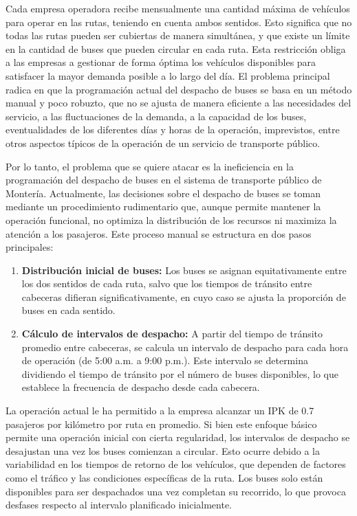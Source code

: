 \documentclass[preprint,11pt]{elsarticle}
\begin{document}
Cada empresa operadora recibe mensualmente una cantidad máxima de vehículos para operar en las rutas, teniendo en cuenta ambos sentidos. Esto significa que no todas las rutas pueden ser cubiertas de manera simultánea, y que existe un límite en la cantidad de buses que pueden circular en cada ruta. Esta restricción obliga a las empresas a gestionar de forma óptima los vehículos disponibles para satisfacer la mayor demanda posible a lo largo del día. El problema principal radica en que la programación actual del despacho de buses se basa en un método manual y poco robuzto, que no se ajusta de manera eficiente a las necesidades del servicio, a las fluctuaciones de la demanda, a la capacidad de los buses, eventualidades de los diferentes días y horas de la operación, imprevistos, entre otros aspectos típicos de la operación de un servicio de transporte público.

Por lo tanto, el problema que se quiere atacar es la ineficiencia en la programación del despacho de buses en el sistema de transporte público de Montería. Actualmente, las decisiones sobre el despacho de buses se toman mediante un procedimiento rudimentario que, aunque permite mantener la operación funcional, no optimiza la distribución de los recursos ni maximiza la atención a los pasajeros. Este proceso manual se estructura en dos pasos principales:

\begin{enumerate}
    \item \textbf{Distribución inicial de buses:} Los buses se asignan equitativamente entre los dos sentidos de cada ruta, salvo que los tiempos de tránsito entre cabeceras difieran significativamente, en cuyo caso se ajusta la proporción de buses en cada sentido.
    \item \textbf{Cálculo de intervalos de despacho:} A partir del tiempo de tránsito promedio entre cabeceras, se calcula un intervalo de despacho para cada hora de operación (de 5:00 a.m. a 9:00 p.m.). Este intervalo se determina dividiendo el tiempo de tránsito por el número de buses disponibles, lo que establece la frecuencia de despacho desde cada cabecera.
\end{enumerate}

La operación actual le ha permitido a la empresa alcanzar un IPK de 0.7 pasajeros por kilómetro por ruta en promedio. Si bien este enfoque básico permite una operación inicial con cierta regularidad, los intervalos de despacho se desajustan una vez los buses comienzan a circular. Esto ocurre debido a la variabilidad en los tiempos de retorno de los vehículos, que dependen de factores como el tráfico y las condiciones específicas de la ruta. Los buses solo están disponibles para ser despachados una vez completan su recorrido, lo que provoca desfases respecto al intervalo planificado inicialmente.
\end{document}
